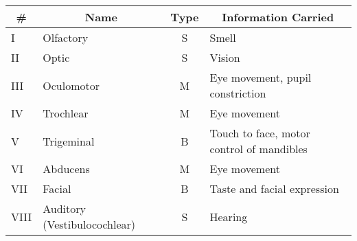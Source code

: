 \begin{table}[htbp]
    \centering
    \begin{tabular}{p{0.7cm}p{3.3cm}cp{9cm}}
        \toprule
        \multicolumn{1}{c}{\textbf{\#}} & \multicolumn{1}{c}{\textbf{Name}}     & \multicolumn{1}{c}{\textbf{Type}} & \multicolumn{1}{c}{\textbf{Information Carried}}                                                                           \\
        \midrule
        I                               & Olfactory                             & S                                 & Smell                                                                                                                      \\
        II                              & Optic                                 & S                                 & Vision                                                                                                                     \\
        III                             & Oculomotor                            & M                                 & Eye movement, pupil constriction                                                                                           \\
        IV                              & Trochlear                             & M                                 & Eye movement                                                                                                               \\
        V                               & Trigeminal                            & B                                 & Touch to face, motor control of mandibles                                                                                  \\
        VI                              & Abducens                              & M                                 & Eye movement                                                                                                               \\
        VII                             & Facial                                & B                                 & Taste and facial expression                                                                                                \\
        VIII                            & Auditory \newline (Vestibulocochlear) & S                                 & Hearing                                                                                                                    \\

\end{tabular}
\end{table}
